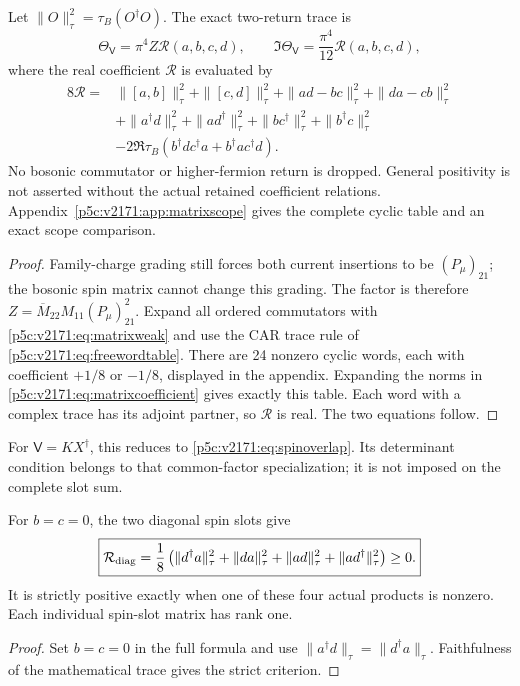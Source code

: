 \documentclass[12pt,a4paper]{article}
\begin{document}
\begin{theorem}
\label{p5c:v2171:thm:matrixweak}
Let $\|O\|_\tau^2=\tau_B(O^\dagger O)$. The exact two-return trace is
\begin{equation}
 \boxed{\Theta_{\mathsf V}=\pi^4Z\mathcal R(a,b,c,d),\qquad
  \Im\Theta_{\mathsf V}=\frac{\pi^4}{12}\mathcal R(a,b,c,d),}
 \label{p5c:v2171:eq:matrixcp}
\end{equation}
where the real coefficient $\mathcal R$ is evaluated by
\begin{equation}
 \boxed{\begin{aligned}
 8\mathcal R={}&\|[a,b]\|_\tau^2+\|[c,d]\|_\tau^2
 +\|ad-bc\|_\tau^2+\|da-cb\|_\tau^2\\
 &+\|a^\dagger d\|_\tau^2+\|ad^\dagger\|_\tau^2
 +\|bc^\dagger\|_\tau^2+\|b^\dagger c\|_\tau^2\\
 &-2\Re\tau_B(b^\dagger d c^\dagger a+b^\dagger a c^\dagger d).
 \end{aligned}}
 \label{p5c:v2171:eq:matrixcoefficient}
\end{equation}
No bosonic commutator or higher-fermion return is dropped. General positivity
is not asserted without the actual retained coefficient relations.
Appendix~\ref{p5c:v2171:app:matrixscope} gives the complete cyclic table and an
exact scope comparison.
\end{theorem}
\begin{proof}
Family-charge grading still forces both current insertions to be
$(P_\mu)_{21}$; the bosonic spin matrix cannot change this grading.
The factor is therefore $Z=\overline M_{22}M_{11}(P_\mu)_{21}^2$.
Expand all ordered commutators with \eqref{p5c:v2171:eq:matrixweak} and use the
CAR trace rule of \eqref{p5c:v2171:eq:freewordtable}. There are 24 nonzero cyclic
words, each with coefficient $+1/8$ or $-1/8$, displayed in the appendix.
Expanding the norms in \eqref{p5c:v2171:eq:matrixcoefficient} gives exactly this
table. Each word with a complex trace has its adjoint partner, so
$\mathcal R$ is real. The two equations follow.
\end{proof}
For $\mathsf V=KX^\dagger$, this reduces to \eqref{p5c:v2171:eq:spinoverlap}.
Its determinant condition belongs to that common-factor specialization;
it is not imposed on the complete slot sum.

\begin{corollary}
\label{p5c:v2171:cor:complementaryslots}
For $b=c=0$, the two diagonal spin slots give
\begin{equation}
 \boxed{\mathcal R_{\rm diag}=\frac18\left(
 \|d^\dagger a\|_\tau^2+\|da\|_\tau^2
 +\|ad\|_\tau^2+\|ad^\dagger\|_\tau^2\right)\ge0.}
 \label{p5c:v2171:eq:complementaryslots}
\end{equation}
It is strictly positive exactly when one of these four actual products is
nonzero. Each individual spin-slot matrix has rank one.
\end{corollary}
\begin{proof}
Set $b=c=0$ in the full formula and use
$\|a^\dagger d\|_\tau=\|d^\dagger a\|_\tau$.
Faithfulness of the mathematical trace gives the strict criterion.
\end{proof}
\end{document}
